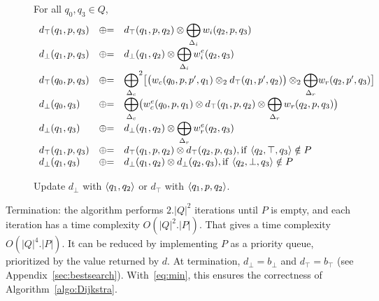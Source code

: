 \begin{figure}
For all $q_0, q_3 \in Q$, %
\[
\begin{array}{lcl}
d_\top(q_1, p, q_3) & \opluseq &
  d_\top(q_1, p, q_2) \otimes
  \displaystyle\bigoplus_{\Deltai} \weii(q_2, p, q_3)\\
%
d_\bot(q_1, p, q_3) & \opluseq &
  d_\bot(q_1, q_2) \otimes
  \displaystyle\bigoplus_{\Deltai} \weiei(q_2, q_3)\\
%
d_\top(q_0, p, q_3) & \opluseq &
  {\displaystyle\bigoplus_{\Deltac}}^2
  \bigl[ \bigl( \weic(q_0, p, p', q_1) \otimes_2
  d_\top(q_1, p', q_2) \bigr) \otimes_2
  {\displaystyle\bigoplus_{\Deltar}} \weir(q_2, p', q_3) \bigr]\\
%
d_\bot(q_0, q_3) & \opluseq &
  {\displaystyle\bigoplus_{\Deltac}}
  \bigl(
  \weiec(q_0, p, q_1) \otimes
   d_\top(q_1, p, q_2) \otimes
  \displaystyle\bigoplus_{\Deltar} \weir(q_2, p, q_3)\bigr)\\
%
d_\bot(q_1, q_3) & \opluseq &
  d_\bot(q_1, q_2) \otimes
  \displaystyle\bigoplus_{\Deltar} \weier(q_2, q_3)\\
%
d_\top(q_1, p, q_3) & \opluseq &
  d_\top(q_1, p, q_2) \otimes d_\top(q_2, p, q_3),
  \mathrm{if~} \< q_2, \top, q_3> \notin P \\
%
d_\bot(q_1, q_3) & \opluseq &
  d_\bot(q_1, q_2) \otimes d_\bot(q_2, q_3), \mathrm{if~} \< q_2, \bot, q_3> \notin P \\
\end{array}
\]
%
\caption{Update $d_\bot$ with $\<q_1, q_2>$ or $d_\top$ with $\< q_1, p, q_2>$.}
\label{fig:best-update}
\end{figure}


Termination: the algorithm performs $2.|Q|^2$ iterations until $P$ is empty,
and each iteration has a time complexity $O(|Q|^2 . |P|)$.
That gives a time complexity $O(|Q|^4 . |P|)$.
It can be reduced by implementing $P$ as a priority queue,
prioritized by the value returned by $d$.
%
At termination, $d_\bot = b_\bot$ and $d_\top = b_\top$
(see Appendix~\ref{sec:bestsearch}).
With~\eqref{eq:min}, this ensures
the correctness of Algorithm~\ref{algo:Dijkstra}.

